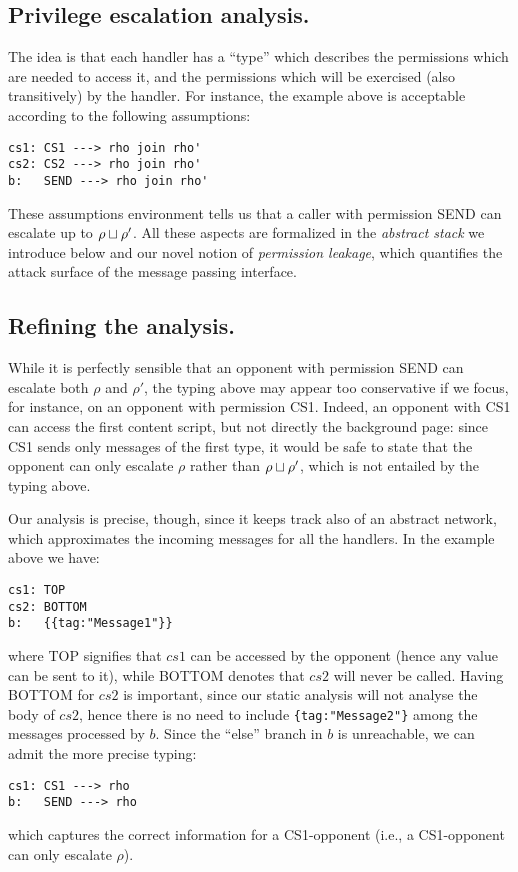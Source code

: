 \subsection{Privilege escalation analysis.}
The idea is that each handler has a ``type'' which describes the permissions which are needed to access it, and the permissions which will be exercised (also transitively) by the handler. For instance, the example above is acceptable according to the following assumptions:
\begin{verbatim}
cs1: CS1 ---> rho join rho'
cs2: CS2 ---> rho join rho'
b:   SEND ---> rho join rho'
\end{verbatim}
These assumptions environment tells us that a caller with permission SEND can escalate up to $\rho \sqcup \rho'$. All these aspects are formalized in the \emph{abstract stack} we introduce below and our novel notion of \emph{permission leakage}, which quantifies the attack surface of the message passing interface.

\subsection{Refining the analysis.}
While it is perfectly sensible that an opponent with permission SEND can escalate both $\rho$ and $\rho'$, the typing above may appear too conservative if we focus, for instance, on an opponent with permission CS1. Indeed, an opponent with CS1 can access the first content script, but not directly the background page: since CS1 sends only messages of the first type, it would be safe to state that the opponent can only escalate $\rho$ rather than $\rho \sqcup \rho'$, which is not entailed by the typing above.

Our analysis is precise, though, since it keeps track also of an abstract network, which approximates the incoming messages for all the handlers. In the example above we have:
\begin{verbatim}
cs1: TOP
cs2: BOTTOM
b:   {{tag:"Message1"}}
\end{verbatim}
where TOP signifies that $cs1$ can be accessed by the opponent (hence any value can be sent to it), while BOTTOM denotes that $cs2$ will never be called. Having BOTTOM for $cs2$ is important, since our static analysis will not analyse the body of $cs2$, hence there is no need to include \texttt{\{tag:"Message2"\}} among the messages processed by $b$. Since the ``else'' branch in $b$ is unreachable, we can admit the more precise typing:
\begin{verbatim}
cs1: CS1 ---> rho
b:   SEND ---> rho
\end{verbatim}
which captures the correct information for a CS1-opponent (i.e., a CS1-opponent can only escalate $\rho$). 

